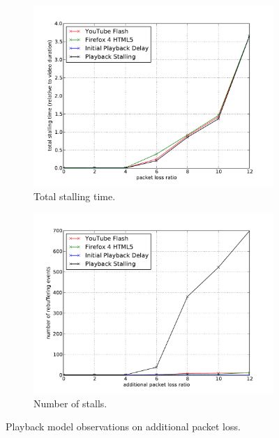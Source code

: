 \begin{figure}[htbp]
	\centering
    	\begin{subfigure}[htbp]{0.9\textwidth}
            \centering
            \includegraphics[width=\textwidth]{images/eval-loss4mb-stallingtime.pdf}
            \caption{Total stalling time.}
            \label{c3:fig:eval-loss-stallingtime}
        \end{subfigure}

    	\begin{subfigure}[htbp]{0.9\textwidth}
            \centering
            \includegraphics[width=\textwidth]{images/eval-loss4mb-frequency.pdf}
            \caption{Number of stalls.}
            \label{c3:fig:eval-loss-numstalls}
        \end{subfigure}
	\caption{Playback model observations on additional packet loss.}
	\label{c3:fig:eval-loss}
\end{figure}
 

